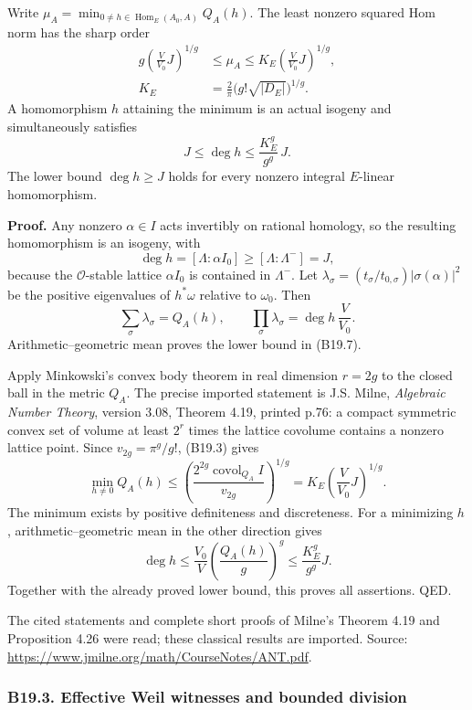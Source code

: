 \documentclass[11pt,a4paper]{article}
\theoremstyle{definition}
\begin{document}
Write \(\mu_A=\min_{0\ne h\in\operatorname{Hom}_E(A_0,A)}Q_A(h)\). The least nonzero squared Hom norm has the sharp order \[
 \begin{aligned}
 g\left(\frac{V}{V_0}J\right)^{1/g}
 &\le\mu_A\le K_E\left(\frac{V}{V_0}J\right)^{1/g},\\
 K_E&=\frac2\pi\bigl(g!\sqrt{|D_E|}\bigr)^{1/g}.
 \end{aligned}
\tag{B19.7}
\] A homomorphism \(h\) attaining the minimum is an actual isogeny and simultaneously satisfies \[
 J\le\deg h\le \frac{K_E^g}{g^g}\,J.
\tag{B19.8}
\] The lower bound \(\deg h\ge J\) holds for every nonzero integral \(E\)-linear homomorphism.

\textbf{Proof.} Any nonzero \(\alpha\in I\) acts invertibly on rational homology, so the resulting homomorphism is an isogeny, with \[
 \deg h=[\Lambda:\alpha I_0]\ge[\Lambda:\Lambda^-]=J,
\] because the \(\mathcal O\)-stable lattice \(\alpha I_0\) is contained in \(\Lambda^-\). Let \(\lambda_\sigma=(t_\sigma/t_{0,\sigma})|\sigma(\alpha)|^2\) be the positive eigenvalues of \(h^*\omega\) relative to \(\omega_0\). Then \[
 \sum_\sigma\lambda_\sigma=Q_A(h),\qquad
 \prod_\sigma\lambda_\sigma=\deg h\,\frac{V}{V_0}.
\] Arithmetic--geometric mean proves the lower bound in (B19.7).

Apply Minkowski's convex body theorem in real dimension \(r=2g\) to the closed ball in the metric \(Q_A\). The precise imported statement is J.S. Milne, \emph{Algebraic Number Theory}, version 3.08, Theorem 4.19, printed p.76: a compact symmetric convex set of volume at least \(2^r\) times the lattice covolume contains a nonzero lattice point. Since \(v_{2g}=\pi^g/g!\), (B19.3) gives \[
 \min_{h\ne0}Q_A(h)
 \le\left(\frac{2^{2g}\operatorname{covol}_{Q_A} I}{v_{2g}}\right)^{1/g}
 =K_E\left(\frac{V}{V_0}J\right)^{1/g}.
\] The minimum exists by positive definiteness and discreteness. For a minimizing \(h\), arithmetic--geometric mean in the other direction gives \[
 \deg h\le\frac{V_0}{V}\left(\frac{Q_A(h)}g\right)^g
 \le \frac{K_E^g}{g^g}J.
\] Together with the already proved lower bound, this proves all assertions. QED.

The cited statements and complete short proofs of Milne's Theorem 4.19 and Proposition 4.26 were read; these classical results are imported. Source: \url{https://www.jmilne.org/math/CourseNotes/ANT.pdf}.

\subsubsection{B19.3. Effective Weil witnesses and bounded division}\label{b19.3.-effective-weil-witnesses-and-bounded-division}
\end{document}
